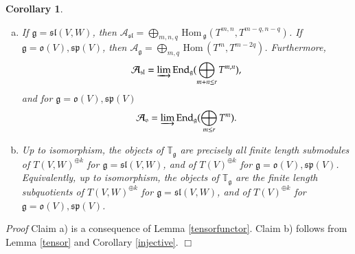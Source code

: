 \documentclass[10pt]{amsart}
\newcounter{theorem}
\newtheorem{corollary}[theo]{Corollary}
\renewenvironment{proof}{ \emph{Proof}}{$\Box$}
\newcommand{\TT}{\mathbb{T}}
\renewcommand{\sp}{\mathfrak{sp}}
\renewcommand{\sl}{\mathfrak{sl}}
\newcommand{\oo}{\mathfrak{o}}
\renewcommand{\gg}{\mathfrak{g}}
\newcommand{\Hom}{\mathrm{Hom}}
\begin{document}
\vspace{0.5cm}
\begin{corollary}\label{corr:1}
 \begin{enumerate}[a)]
  \item If $\gg = \sl(V,W)$, then $\mathcal A_\sl =    \bigoplus_{m,n,q}\,\Hom\,_{\gg}(T^{m,n},T^{m-q,n-q})$. 
If $\gg = \oo(V), \sp(V)$, then 
$\mathcal A_\gg = \bigoplus_{m,q}\,\Hom\,(T^m, T^{m-2q})$. Furthermore,
$$\mathcal A_{\sl}=\varinjlim\operatorname{End}_{\gg}(\bigoplus_{m+n\leq r}T^{m,n}),$$
and for $\gg = \oo(V), \sp(V)$
$$\mathcal A_{\oo}=\varinjlim\operatorname{End}_{\gg}(\bigoplus_{m\leq r}T^{m}).$$ 
  \item Up to isomorphism, the objects of $\TT_\gg$ are precisely all
    finite length submodules of $T(V,W)^{\oplus k}$ 
for $\gg = \sl(V,W)$, and of $T(V)^{\oplus k}$ 
for $\gg = \oo(V), \sp(V)$. Equivalently, up to isomorphism, the
objects of 
$\TT_\gg$ are the finite length subquotients of $T(V,W)^{\oplus k}$ for $\gg = \sl(V,W)$, 
and of $T(V)^{\oplus k}$ for $\gg = \oo(V), \sp(V)$.
 \end{enumerate}
\end{corollary}
\begin{proof} Claim a) is a consequence of Lemma \ref{tensorfunctor}. 
Claim b) follows from Lemma \ref{tensor} and Corollary \ref{injective}.
\end{proof}
\end{document}
